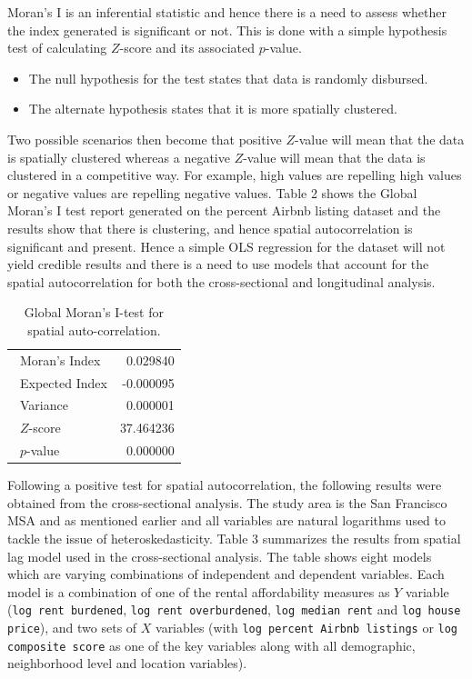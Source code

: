 \documentclass[10pt,letterpaper,onecolumn]{article}
\begin{document}
Moran's I is an inferential statistic and hence there is a need to
assess whether the index generated is significant or not. This is done
with a simple hypothesis test of calculating \(Z\)-score and its associated
\(p\)-value.

\begin{itemize}
\item
The null hypothesis for the test states that data is randomly
disbursed.
\item
The alternate hypothesis states that it is more spatially clustered.
\end{itemize}

Two possible scenarios then become that positive \(Z\)-value will mean that
the data is spatially clustered whereas a negative \(Z\)-value will mean
that the data is clustered in a competitive way. For example, high
values are repelling high values or negative values are repelling
negative values. Table 2 shows the Global Moran's I test report
generated on the percent Airbnb listing dataset and the results show
that there is clustering, and hence spatial autocorrelation is
significant and present. Hence a simple OLS regression for the dataset
will not yield credible results and there is a need to use models that
account for the spatial autocorrelation for both the cross-sectional and
longitudinal analysis.

\begin{table}[H]
  \small
  \centering
  \begin{tabular}{@{}lr@{}}
    \toprule
    ~Moran's Index  \hspace*{1cm} & 0.029840  \\
    ~Expected Index & -0.000095 \\
    ~Variance       & 0.000001  \\
    ~\(Z\)-score        & 37.464236 \\
    ~\(p\)-value        & 0.000000  \\ \bottomrule
  \end{tabular}
  \caption{\small Global Moran's I-test for spatial auto-correlation.}
\end{table}

Following a positive test for spatial autocorrelation, the following
results were obtained from the cross-sectional analysis. The study area
is the San Francisco MSA and as mentioned earlier and all variables are
natural logarithms used to tackle the issue of heteroskedasticity. Table 3 summarizes the results from spatial lag model used in the
cross-sectional analysis. The table shows eight models which are varying
combinations of independent and dependent variables. Each model is a
combination of one of the rental affordability measures as \(Y\) variable
(\texttt{log rent burdened}, \texttt{log rent overburdened}, \texttt{log median rent} and
\texttt{log house price}), and two sets of \(X\) variables (with \texttt{log
percent Airbnb listings} or \texttt{log composite score} as one of the key
variables along with all demographic, neighborhood level and location
variables).
\end{document}
